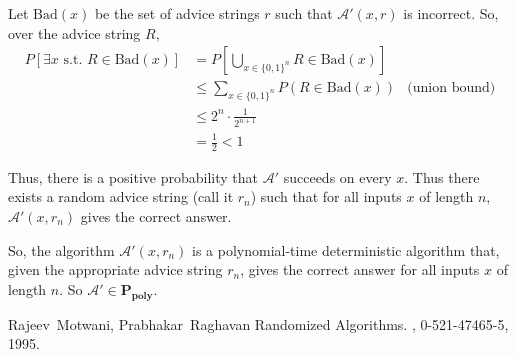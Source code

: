 \documentclass[11pt]{article}
\newcommand{\Ppoly}{\ensuremath{\mathbf{P_{poly}}}}
\newcommand{\Alg}{\ensuremath{\mathcal{A}}}
\begin{document}
Let $\mathrm{Bad}(x)$ be the set of advice strings $r$ such that $\Alg'(x,r)$ is incorrect.
So, over the advice string $R$,
\begin{align*}
  P[\exists x \text{ s.t. $R \in \mathrm{Bad}(x)$}]
  &= P\left[\bigcup_{x \in \{0,1\}^n} R \in \mathrm{Bad}(x) \right] \\
  &\le \sum_{x \in \{0,1\}^n} P(R \in \mathrm{Bad}(x)) &\text{(union bound)}\\
  &\le 2^n \cdot \frac{1}{2^{n+1}} \\
  &= \frac12 < 1
\end{align*}

Thus, there is a positive probability that $\Alg'$ succeeds on every $x$. Thus there exists a random advice string (call it $r_n$) such that for all inputs $x$ of length $n$, $\Alg'(x, r_n)$ gives the correct answer.

So, the algorithm $\Alg'(x, r_n)$ is a polynomial-time deterministic algorithm that, given the appropriate advice string $r_n$, gives the correct answer for all inputs $x$ of length $n$. So $\Alg' \in \Ppoly$.



\begin{thebibliography}{42}


 Rajeev~Motwani, Prabhakar~Raghavan
 \newblock Randomized Algorithms.
 , 0-521-47465-5, 1995. %


\end{thebibliography}
\end{document}
